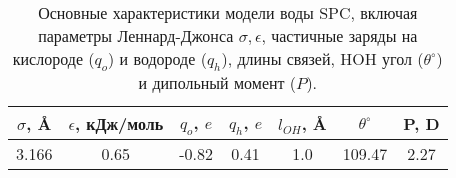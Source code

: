 \begin{table}[p]

	\begin{tabular}{ccccccc}
$\sigma$, \AA & $\epsilon$, кДж/моль & $q_o$, $e$ & $q_h$, $e$ & $l_{OH}$, \AA & $\theta^{\circ}$ & P, D  \\
	\hline
3.166 & 0.65 & -0.82 & 0.41 & 1.0 & 109.47 & 2.27
\end{tabular}

	\caption{Основные характеристики модели воды SPC, включая параметры Леннард-Джонса $\sigma,\epsilon$, частичные заряды на кислороде ($q_o$) и водороде ($q_h$), длины связей, HOH угол ($\theta^{\circ}$) и дипольный момент ($P$).}
	\label{wat_param}
\vspace{2 in}
\end{table}
 